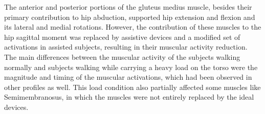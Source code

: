 \documentclass[10pt,letterpaper]{article}
\begin{document}
The anterior and posterior portions of the gluteus medius muscle, besides their primary contribution to hip abduction, supported hip extension and flexion and its lateral and medial rotations. However, the contribution of these muscles to the hip sagittal moment was replaced by assistive devices and a modified set of activations in assisted subjects, resulting in their muscular activity reduction.\\
The main differences between the muscular activity of the subjects walking normally and subjects walking while carrying a heavy load on the torso were the magnitude and timing of the muscular activations, which had been observed in other profiles as well. This load condition also partially affected some muscles like Semimembranosus, in which the muscles were not entirely replaced by the ideal devices.
\end{document}
